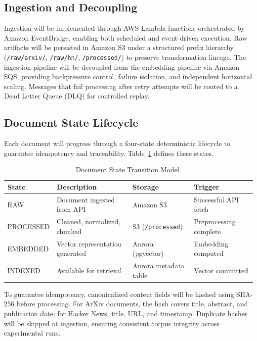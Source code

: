 \documentclass[12pt,a4paper]{report}
\begin{document}
\subsection{Ingestion and Decoupling}

Ingestion will be implemented through AWS Lambda functions orchestrated by Amazon EventBridge, enabling both scheduled and event-driven execution. Raw artifacts will be persisted in Amazon S3 under a structured prefix hierarchy (\texttt{/raw/arxiv/}, \texttt{/raw/hn/}, \texttt{/processed/}) to preserve transformation lineage. The ingestion pipeline will be decoupled from the embedding pipeline via Amazon SQS, providing backpressure control, failure isolation, and independent horizontal scaling. Messages that fail processing after retry attempts will be routed to a Dead Letter Queue (DLQ) for controlled replay.

\subsection{Document State Lifecycle}

Each document will progress through a four-state deterministic lifecycle to guarantee idempotency and traceability. Table~\ref{tab:doc_states} defines these states.

\begin{table}[H]
\caption{Document State Transition Model.}
\label{tab:doc_states}
\centering
\begin{tabular}{p{2.0cm}p{3.8cm}p{3.0cm}p{3.0cm}}
\toprule
\textbf{State} & \textbf{Description} & \textbf{Storage} & \textbf{Trigger} \\
\midrule
RAW & Document ingested from API & Amazon S3 & Successful API fetch \\
PROCESSED & Cleaned, normalized, chunked & S3 (\texttt{/processed}) & Preprocessing complete \\
EMBEDDED & Vector representation generated & Aurora (pgvector) & Embedding computed \\
INDEXED & Available for retrieval & Aurora metadata table & Vector committed \\
\bottomrule
\end{tabular}
\end{table}

To guarantee idempotency, canonicalized content fields will be hashed using SHA-256 before processing. For ArXiv documents, the hash covers title, abstract, and publication date; for Hacker News, title, URL, and timestamp. Duplicate hashes will be skipped at ingestion, ensuring consistent corpus integrity across experimental runs.
\end{document}
